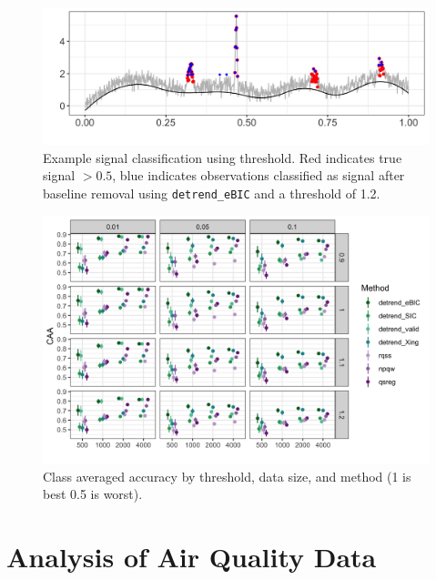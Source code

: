\documentclass[aoas]{imsart}
\begin{document}
\begin{figure}[h!]
	\includegraphics[width = \linewidth]{Figures/peaks_eg_class.png}
	\caption{Example signal classification using threshold. Red indicates true signal $>0.5$, blue indicates observations classified as signal after baseline removal using \texttt{detrend\_eBIC} and a threshold of 1.2.}
	\label{fig:peaks_class_eg}
\end{figure}


\begin{figure}[h!]
	\includegraphics[width = \linewidth]{Figures/peaks_CAA.png}
	\caption{Class averaged accuracy by threshold, data size, and method (1 is best 0.5 is worst).}
\end{figure}


\FloatBarrier

\section{Analysis of Air Quality Data}
\end{document}
